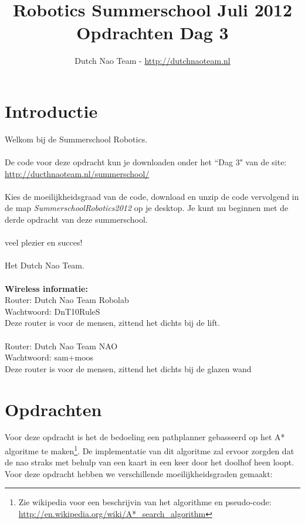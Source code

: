 \documentclass[a4paper]{article}
\title{\textbf{Robotics Summerschool Juli 2012} \\ Opdrachten Dag 3}
\author{Dutch Nao Team - \url{http://dutchnaoteam.nl}}
\date{}
\begin{document}
\maketitle

\section{Introductie}
Welkom bij de Summerschool Robotics.\\
\\
De code voor deze opdracht kun je downloaden onder het ``Dag 3" van de site:\\ 
\url{http://ducthnaoteam.nl/summerschool/}\\
\\
Kies de moeilijkheidsgraad van de code, download en unzip de code vervolgend in de map \textit{SummerschoolRobotics2012} op je desktop. Je kunt nu beginnen met de derde opdracht van deze summerschool. \\
\\
veel plezier en succes!\\
\\
Het Dutch Nao Team.\\
\\
\textbf{Wireless informatie:}\\
Router:  Dutch Nao Team Robolab\\
Wachtwoord: DnT10RuleS\\
Deze router is voor de mensen, zittend het dichts bij de lift.\\
\\
Router:  Dutch Nao Team NAO\\
Wachtwoord: sam+moos\\
Deze router is voor de mensen, zittend het dichts bij de glazen wand

\tableofcontents

\newpage

\section{Opdrachten}
Voor deze opdracht is het de bedoeling een pathplanner gebasseerd op het A* algoritme te maken\footnote{Zie wikipedia voor een beschrijvin van het algorithme en pseudo-code: \url{http://en.wikipedia.org/wiki/A*_search_algorithm}}. De implementatie van dit algoritme zal ervoor zorgden dat de nao straks met behulp van een kaart in een keer door het doolhof heen loopt. Voor deze opdracht hebben we verschillende moeilijkheidsgraden gemaakt:
\end{document}
